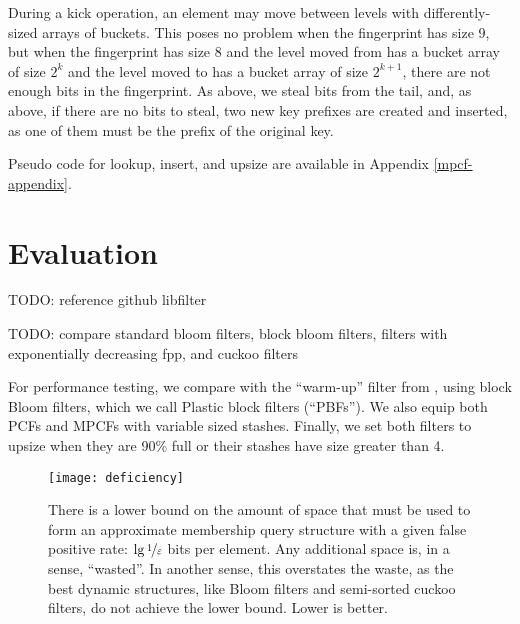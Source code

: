 \documentclass[letterpaper, 11pt]{article}
\begin{document}

During a kick operation, an element may move between levels with differently-sized arrays of buckets.
This poses no problem when the fingerprint has size 9, but when the fingerprint has size 8 and the level moved from has a bucket array of size $2^k$ and the level moved to has a bucket array of size $2^{k+1}$,  there are not enough bits in the fingerprint.
As above, we steal bits from the tail, and, as above, if there are no bits to steal, two new key prefixes are created and inserted, as one of them must be the prefix of the original key.

Pseudo code for lookup, insert, and upsize are available in Appendix \ref{mpcf-appendix}.

\section{Evaluation}
\label{eval}

TODO: reference github libfilter

TODO: compare standard bloom filters, block bloom filters, filters with exponentially decreasing fpp, and cuckoo filters

For performance testing, we compare with the ``warm-up'' filter from \cite{psw}, using block Bloom filters, which we call Plastic block filters (``PBFs''). \cite{block-bloom}
We also equip both PCFs and MPCFs with variable sized stashes. \cite{stash}
Finally, we set both filters to upsize when they are 90\% full or their stashes have size greater than 4.

\begin{figure}
  \texttt{[image: deficiency]}
  \caption{
    There is a lower bound on the amount of space that must be used to form an approximate membership query structure with a given false positive rate: $\lg \nicefrac{1}{\varepsilon}$ bits per element.
    Any additional space is, in a sense, ``wasted''.
    In another sense, this overstates the waste, as the best dynamic structures, like Bloom filters and semi-sorted cuckoo filters, do not achieve the lower bound.
    Lower is better.
  }
\end{figure}

\end{document}
